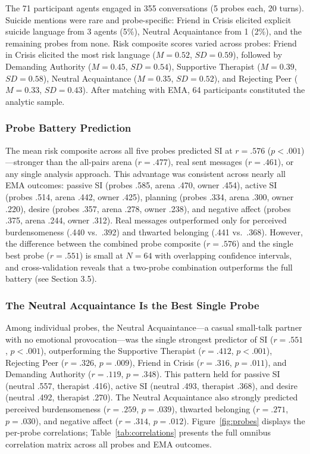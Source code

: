 \documentclass[review,12pt,authoryear]{elsarticle}
\begin{document}
The 71 participant agents engaged in 355 conversations (5 probes each, 20 turns). Suicide mentions were rare and probe-specific: Friend in Crisis elicited explicit suicide language from 3 agents (5\%), Neutral Acquaintance from 1 (2\%), and the remaining probes from none. Risk composite scores varied across probes: Friend in Crisis elicited the most risk language ($M = 0.52$, $SD = 0.59$), followed by Demanding Authority ($M = 0.45$, $SD = 0.54$), Supportive Therapist ($M = 0.39$, $SD = 0.58$), Neutral Acquaintance ($M = 0.35$, $SD = 0.52$), and Rejecting Peer ($M = 0.33$, $SD = 0.43$). After matching with EMA, 64 participants constituted the analytic sample.

\subsubsection{Probe Battery Prediction}

The mean risk composite across all five probes predicted SI at $r = .576$ ($p < .001$)---stronger than the all-pairs arena ($r = .477$), real sent messages ($r = .461$), or any single analysis approach. This advantage was consistent across nearly all EMA outcomes: passive SI (probes .585, arena .470, owner .454), active SI (probes .514, arena .442, owner .425), planning (probes .334, arena .300, owner .220), desire (probes .357, arena .278, owner .238), and negative affect (probes .375, arena .244, owner .312). Real messages outperformed only for perceived burdensomeness (.440 vs.\ .392) and thwarted belonging (.441 vs.\ .368). However, the difference between the combined probe composite ($r = .576$) and the single best probe ($r = .551$) is small at $N = 64$ with overlapping confidence intervals, and cross-validation reveals that a two-probe combination outperforms the full battery (see Section 3.5).

\subsubsection{The Neutral Acquaintance Is the Best Single Probe}

Among individual probes, the Neutral Acquaintance---a casual small-talk partner with no emotional provocation---was the single strongest predictor of SI ($r = .551$, $p < .001$), outperforming the Supportive Therapist ($r = .412$, $p < .001$), Rejecting Peer ($r = .326$, $p = .009$), Friend in Crisis ($r = .316$, $p = .011$), and Demanding Authority ($r = .119$, $p = .348$). This pattern held for passive SI (neutral .557, therapist .416), active SI (neutral .493, therapist .368), and desire (neutral .492, therapist .270). The Neutral Acquaintance also strongly predicted perceived burdensomeness ($r = .259$, $p = .039$), thwarted belonging ($r = .271$, $p = .030$), and negative affect ($r = .314$, $p = .012$). Figure~\ref{fig:probes} displays the per-probe correlations; Table~\ref{tab:correlations} presents the full omnibus correlation matrix across all probes and EMA outcomes.
\end{document}
